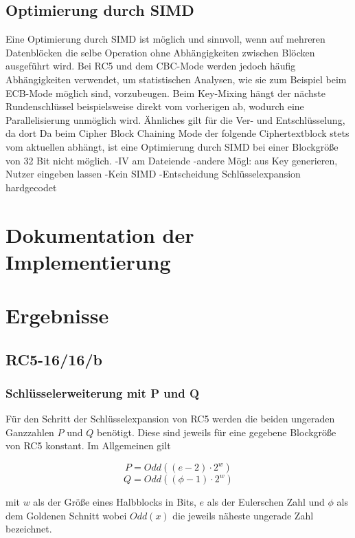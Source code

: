 \documentclass[course=erap]{aspdoc}
\begin{document}
\subsection{Optimierung durch SIMD}
Eine Optimierung durch SIMD ist möglich und sinnvoll, wenn auf mehreren Datenblöcken die selbe Operation ohne Abhängigkeiten zwischen Blöcken ausgeführt wird. Bei RC5 und dem CBC-Mode werden jedoch häufig Abhängigkeiten verwendet, um statistischen Analysen, wie sie zum Beispiel beim ECB-Mode möglich sind, vorzubeugen.
Beim Key-Mixing hängt der nächste Rundenschlüssel beispielsweise direkt vom vorherigen ab, wodurch eine Parallelisierung unmöglich wird.
Ähnliches gilt für die Ver- und Entschlüsselung, da dort 
Da beim Cipher Block Chaining Mode der folgende Ciphertextblock stets vom aktuellen abhängt, ist eine Optimierung durch SIMD bei einer Blockgröße von 32 Bit nicht möglich.
-IV am Dateiende
	-andere Mögl: aus Key generieren, Nutzer eingeben lassen
-Kein SIMD
-Entscheidung Schlüsselexpansion hardgecodet

\section{Dokumentation der Implementierung}


\section{Ergebnisse}

\subsection{RC5-16/16/b}

\subsubsection{Schlüsselerweiterung mit P und Q}

Für den Schritt der Schlüsselexpansion von RC5 werden die beiden ungeraden Ganzzahlen $P$ und $Q$ benötigt. Diese sind jeweils für eine gegebene Blockgröße von RC5 konstant. Im Allgemeinen gilt

\begin{equation}
    P = Odd((e - 2) \cdot 2^w)
\end{equation}
\begin{equation}
    Q = Odd((\phi - 1) \cdot 2^w)
\end{equation}

mit $w$ als der Größe eines Halbblocks in Bits, $e$ als der Eulerschen Zahl und $\phi$ als dem Goldenen Schnitt wobei $Odd(x)$ die jeweils näheste ungerade Zahl bezeichnet.\bigbreak
\end{document}
